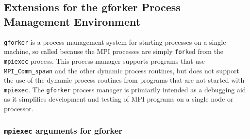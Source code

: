 \documentclass[dvipdfm,11pt]{article}
\begin{document}
\subsection{Extensions for the gforker Process Management Environment}
\label{sec:extensions-forker}
\texttt{gforker} is a process management system for starting
processes on a single machine, so called because the MPI processes are
simply \texttt{fork}ed from the \texttt{mpiexec} process.  This process
manager supports programs that use \texttt{MPI\_Comm\_spawn} and the other
dynamic process routines, but does not support the use of the dynamic process
routines from programs that are not started with \texttt{mpiexec}.  The
\texttt{gforker} process manager is primiarily intended as a debugging aid as
it simplifies development and testing of MPI programs on a single node or
processor.  

\subsubsection{\texttt{mpiexec} arguments for gforker}
\label{sec:mpiexec-forker}
\end{document}
